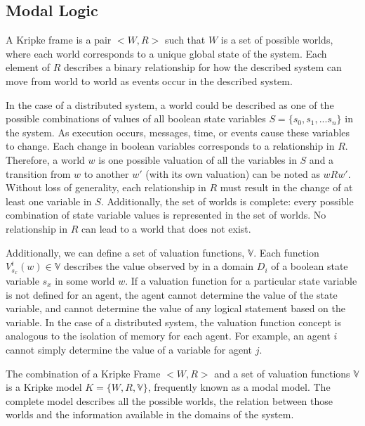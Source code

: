\subsection{Modal Logic}

A Kripke frame is a pair $<W,R>$\cite{french2006} such that $W$ is a set of possible worlds, where each world corresponds to a unique global state of the system.
Each element of $R$ describes a binary relationship for how the described system can move from world to world as events occur in the described system.

In the case of a distributed system, a world could be described as one of the possible combinations of values of all boolean state variables $S=\{s_0, s_1, ... s_n\}$ in the system.
As execution occurs, messages, time, or events cause these variables to change.
Each change in boolean variables corresponds to a relationship in $R$\cite{Gehrke200565}.
Therefore, a world $w$ is one possible valuation of all the variables in $S$ and a transition from $w$ to another $w'$ (with its own valuation) can be noted as $wRw'$.
Without loss of generality, each relationship in $R$ must result in the change of at least one variable in $S$.
Additionally, the set of worlds is complete: every possible combination of state variable values is represented in the set of worlds.
No relationship in $R$ can lead to a world that does not exist.

Additionally, we can define a set of valuation functions, $\mathbb{V}$.
Each function $V^i_{s_x}(w) \in \mathbb{V}$ describes the value observed by in a domain $D_i$ of a boolean state variable $s_x$ in some world $w$. 
If a valuation function for a particular state variable is not defined for an agent, the agent cannot determine the value of the state variable, and cannot determine the value of any logical statement based on the variable.
In the case of a distributed system, the valuation function concept is analogous to the isolation of memory for each agent.
For example, an agent $i$ cannot simply determine the value of a variable for agent $j$.

The combination of a Kripke Frame $< W,R >$ and a set of valuation functions $\mathbb{V}$ is a Kripke model $K = \{W, R, \mathbb{V}\}$, frequently known as a modal model.
The complete model describes all the possible worlds, the relation between those worlds and the information available in the domains of the system.

